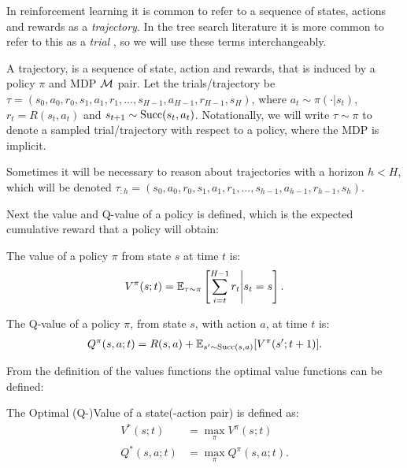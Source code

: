 

    In reinforcement learning it is common to refer to a sequence of states, actions and rewards as a \textit{trajectory}. In the tree search literature it is more common to refer to this as a \textit{trial} , so we will use these terms interchangeably.
    
    \begin{defn}
        \label{def:trajectory}
        A \textnormal{trajectory}, is a sequence of state, action and rewards, that is induced by a policy $\pi$ and MDP $\mathcal{M}$ pair. Let the trials/trajectory be $\tau = (s_0, a_0, r_0, s_1, a_1, r_1, ..., s_{H-1}, a_{H-1}, r_{H-1}, s_H)$, where $a_t \sim \pi(\cdot|s_t)$, $r_t=R(s_t,a_t)$ and $s_{t+1} \sim \textnormal{Succ}(s_t,a_t)$. Notationally, we will write $\tau\sim\pi$ to denote a sampled trial/trajectory with respect to a policy, where the MDP is implicit.

        Sometimes it will be necessary to reason about trajectories with a horizon $h<H$, which will be denoted $\tau_{:h} = (s_0, a_0, r_0, s_1, a_1, r_1, ..., s_{h-1}, a_{h-1}, r_{h-1}, s_h)$.
    \end{defn}

    Next the value and Q-value of a policy is defined, which is the expected cumulative reward that a policy will obtain:
    \begin{defn}
        \label{def:value}
        \label{def:q_value}
        The \textnormal{value} of a policy $\pi$ from state $s$ at time $t$ is:
        \begin{align}
            V^{\pi}(s;t) = \mathbb{E}_{\tau\sim\pi}\left[\sum_{i=t}^{H-1} r_t \Bigg| s_t=s \right].
        \end{align} 

        The \textnormal{Q-value} of a policy $\pi$, from state $s$, with action $a$, at time $t$ is:
        \begin{align}
            Q^{\pi}(s,a;t) = R(s,a) + \mathbb{E}_{s'\sim \textnormal{Succ}(s,a)} [V^{\pi}(s';t+1)].
        \end{align} 
    \end{defn}

    From the definition of the values functions the optimal value functions can be defined:
    \begin{defn}
        \label{def:optimal_value}
        \label{def:optimal_q_value}
        The \textnormal{Optimal (Q-)Value} of a state(-action pair) is defined as:
        \begin{align}
            V^*(s;t) &= \max_{\pi} V^{\pi}(s;t) \\
            Q^*(s,a;t) &= \max_{\pi} Q^{\pi}(s,a;t).
        \end{align}
    \end{defn}

